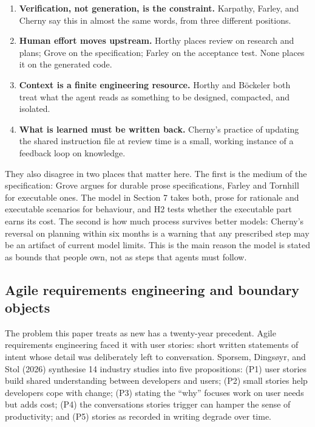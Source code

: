 \documentclass[11pt]{article}
\begin{document}
\begin{enumerate}[leftmargin=*]
  \item \textbf{Verification, not generation, is the constraint.} Karpathy, Farley, and Cherny say this in almost the same words, from three different positions.
  \item \textbf{Human effort moves upstream.} Horthy places review on research and plans; Grove on the specification; Farley on the acceptance test. None places it on the generated code.
  \item \textbf{Context is a finite engineering resource.} Horthy and B\"ockeler both treat what the agent reads as something to be designed, compacted, and isolated.
  \item \textbf{What is learned must be written back.} Cherny's practice of updating the shared instruction file at review time is a small, working instance of a feedback loop on knowledge.
\end{enumerate}

They also disagree in two places that matter here. The first is the medium of the specification: Grove argues for durable prose specifications, Farley and Tornhill for executable ones. The model in Section 7 takes both, prose for rationale and executable scenarios for behaviour, and H2 tests whether the executable part earns its cost. The second is how much process survives better models: Cherny's reversal on planning within six months is a warning that any prescribed step may be an artifact of current model limits. This is the main reason the model is stated as bounds that people own, not as steps that agents must follow.

\subsection{Agile requirements engineering and boundary objects}

The problem this paper treats as new has a twenty-year precedent. Agile requirements engineering faced it with user stories: short written statements of intent whose detail was deliberately left to conversation. Sporsem, Dings{\o}yr, and Stol (2026) synthesise 14 industry studies into five propositions: (P1) user stories build shared understanding between developers and users; (P2) small stories help developers cope with change; (P3) stating the ``why'' focuses work on user needs but adds cost; (P4) the conversations stories trigger can hamper the sense of productivity; and (P5) stories as recorded in writing degrade over time.
\end{document}
